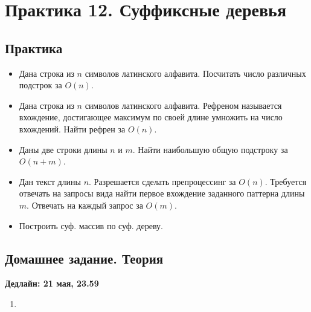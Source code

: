 \section{Практика 12. Суффиксные деревья}

\subsection{Практика}

\begin{itemize}

  \item Дана строка из $n$ символов латинского алфавита. Посчитать число различных 
  подстрок за $O(n)$.

  \item Дана строка из $n$ символов латинского алфавита. Рефреном называется
  вхождение, достигающее максимум по своей длине умножить на число вхождений.
  Найти рефрен за $O(n)$.

  \item Даны две строки длины $n$ и $m$. Найти наибольшую общую подстроку
  за $O(n + m)$.

  \item Дан текст длины $n$. Разрешается сделать препроцессинг за $O(n)$.
  Требуется отвечать на запросы вида найти первое вхождение заданного 
  паттерна длины $m$. Отвечать на каждый запрос за $O(m)$.

  \item Построить суф. массив по суф. дереву.

\end{itemize}

\subsection{Домашнее задание. Теория}
\textbf{Дедлайн: 21 мая, 23.59}

\begin{enumerate}

  \item 

\end{enumerate}



\clearpage
